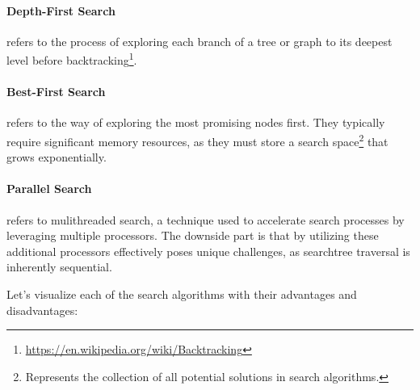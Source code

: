 \paragraph{Depth-First Search} refers to the process of exploring each branch of a tree or graph to its deepest level before backtracking\footnote{\url{https://en.wikipedia.org/wiki/Backtracking}}.

\paragraph{Best-First Search} refers to the way of exploring the most promising nodes first. They typically require significant memory resources, as they must store a search space\footnote{Represents the collection of all potential solutions in search algorithms.} that grows exponentially.

\paragraph{Parallel Search} refers to mulithreaded search, a technique used to accelerate search processes by leveraging multiple processors. The downside part is that by utilizing these additional processors effectively poses unique challenges, as searchtree traversal is inherently sequential.

\vspace{1em}

Let's visualize each of the search algorithms with their advantages and disadvantages:

